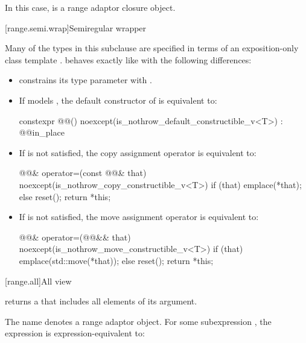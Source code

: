 In this case,  is a range adaptor
closure object.

[range.semi.wrap]{Semiregular wrapper}

\pnum
Many of the types in this subclause are specified in terms of
an exposition-only class template .
 behaves exactly like 
with the following differences:

\begin{itemize}
\item {} constrains
its type parameter  with
.

\item If  models , the default
constructor of  is equivalent to:
\begin{codeblock}
constexpr @@() noexcept(is_nothrow_default_constructible_v<T>)
  : @@{in_place}
{ }
\end{codeblock}

\item If  is not
satisfied, the copy assignment operator is equivalent to:
\begin{codeblock}
@@& operator=(const @@& that)
  noexcept(is_nothrow_copy_constructible_v<T>)
{
  if (that) emplace(*that);
  else reset();
  return *this;
}
\end{codeblock}

\item If  is not satisfied,
the move assignment operator is equivalent to:
\begin{codeblock}
@@& operator=(@@&& that)
  noexcept(is_nothrow_move_constructible_v<T>)
{
  if (that) emplace(std::move(*that));
  else reset();
  return *this;
}
\end{codeblock}
\end{itemize}

[range.all]{All view}

\pnum
{} returns a  that includes all elements of
its  argument.

\pnum
The name  denotes a
range adaptor object.
For some subexpression , the expression
 is expression-equivalent to:


